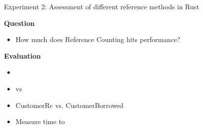 \documentclass[9pt]{beamer}
\begin{document}
\begin{frame}[fragile]{Experiment 2: Assessment of different reference methods in Rust}

    \textbf{Question}
    \begin{itemize}
        \item How much does Reference Counting hits performance?
    \end{itemize}

    \vspace{0.5cm}

    \textbf{Evaluation}
    \begin{itemize}
        \item {}
        \item {} vs 
        \item CustomerRc vs. CustomerBorrowed
        \item Measure time to 
    \end{itemize}

\end{frame}


% 
\end{document}
